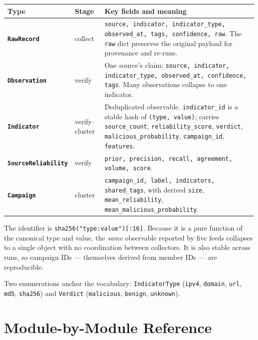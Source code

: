 \documentclass[11pt,a4paper]{article}
\newcommand{\code}[1]{\texttt{\small #1}}
\begin{document}
\begin{center}
\begin{tabularx}{\linewidth}{@{}>{\bfseries}p{3.2cm}p{2.5cm}X@{}}
\toprule
\rowcolor{paper}\textbf{Type} & \textbf{Stage} & \textbf{Key fields and meaning} \\
\midrule
\code{RawRecord} & collect & \code{source, indicator, indicator\_type, observed\_at, tags, confidence, raw}. The \code{raw} dict preserves the original payload for provenance and re-runs. \\
\code{Observation} & verify & One source's claim: \code{source, indicator, indicator\_type, observed\_at, confidence, tags}. Many observations collapse to one indicator. \\
\code{Indicator} & verify--cluster & Deduplicated observable. \code{indicator\_id} is a stable hash of \code{(type, value)}; carries \code{source\_count}, \code{reliability\_score}, \code{verdict}, \code{malicious\_probability}, \code{campaign\_id}, \code{features}. \\
\code{SourceReliability} & verify & \code{prior, precision, recall, agreement, volume, score}. \\
\code{Campaign} & cluster & \code{campaign\_id, label, indicators, shared\_tags}, with derived \code{size}, \code{mean\_reliability}, \code{mean\_malicious\_probability}. \\
\bottomrule
\end{tabularx}
\end{center}

\begin{keybox}[Why \code{indicator\_id} is a hash]
The identifier is \code{sha256("type:value")[:16]}. Because it is a pure
function of the canonical type and value, the \emph{same} observable reported by
five feeds collapses to a single object with no coordination between collectors.
It is also stable across runs, so campaign IDs --- themselves derived from
member IDs --- are reproducible.
\end{keybox}

Two enumerations anchor the vocabulary: \code{IndicatorType} (\code{ipv4},
\code{domain}, \code{url}, \code{md5}, \code{sha256}) and \code{Verdict}
(\code{malicious}, \code{benign}, \code{unknown}).

\section{Module-by-Module Reference}
\end{document}

